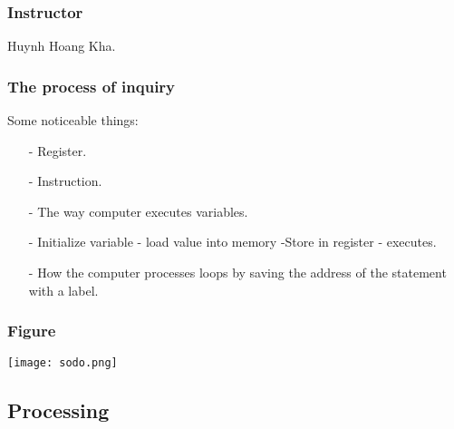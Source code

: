\documentclass[10pt]{article}
\begin{document}
\begin{large}
	    \subsubsection{Instructor}
	        Huynh Hoang Kha.
	    \subsubsection{The process of inquiry}
            Some noticeable things:
            \begin{itemize}
                \item[-]
                    Register.
                \item[-]
                    Instruction.
                \item[-]
                    The way computer executes variables.
                \item[-]
                    Initialize variable - load value into memory -Store in register - executes.
                \item[-]
                    How the computer processes loops by saving the address of the statement with a label.
	        \end{itemize}
	    \subsubsection{Figure}
            \begin{flushleft}
                \texttt{[image: sodo.png]}
            \end{flushleft}
    \subsection{Processing}

\end{large}
\end{document}
